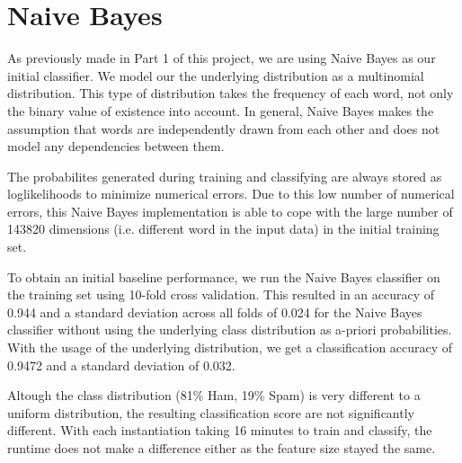 \section{Naive Bayes}
As previously made in Part 1 of this project, we are using Naive Bayes as our initial classifier.
We model our the underlying distribution as a multinomial distribution.
This type of distribution takes the frequency of each word, not only the binary value of existence into account.
In general, Naive Bayes makes the assumption that words are independently drawn from each other and does not model any dependencies between them.

The probabilites generated during training and classifying are always stored as loglikelihoods to minimize numerical errors.
Due to this low number of numerical errors, this Naive Bayes implementation is able to cope with the large number of 143820 dimensions (i.e. different word in the input data) in the initial training set.

To obtain an initial baseline performance, we run the Naive Bayes classifier on the training set using 10-fold cross validation.
This resulted in an accuracy of 0.944 and a standard deviation across all folds of 0.024 for the Naive Bayes classifier without using the underlying class distribution as a-priori probabilities.
With the usage of the underlying distribution, we get a classification accuracy of 0.9472 and a standard deviation of 0.032.

Altough the class distribution (81\% Ham, 19\% Spam) is very different to a uniform distribution, the resulting classification score are not significantly different.
With each instantiation taking 16 minutes to train and classify, the runtime does not make a difference either as the feature size stayed the same.

